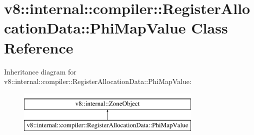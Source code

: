 \hypertarget{classv8_1_1internal_1_1compiler_1_1RegisterAllocationData_1_1PhiMapValue}{}\section{v8\+:\+:internal\+:\+:compiler\+:\+:Register\+Allocation\+Data\+:\+:Phi\+Map\+Value Class Reference}
\label{classv8_1_1internal_1_1compiler_1_1RegisterAllocationData_1_1PhiMapValue}
Inheritance diagram for v8\+:\+:internal\+:\+:compiler\+:\+:Register\+Allocation\+Data\+:\+:Phi\+Map\+Value\+:\begin{figure}[H]
\begin{center}
\leavevmode
\includegraphics[height=2.000000cm]{classv8_1_1internal_1_1compiler_1_1RegisterAllocationData_1_1PhiMapValue}
\end{center}
\end{figure}
